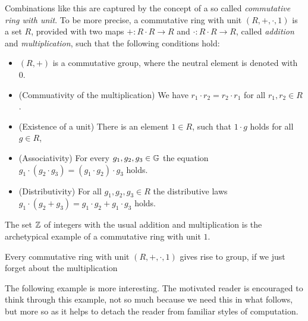 Combinations like this are captured by the concept of a so called \textit{commutative ring with unit}. To be more precise, a commutative ring with unit $ (R, +, \cdot, 1) $ is a set $R$, provided with two maps $ +: R \cdot R \to R $ and $ \cdot: R \cdot R \to R $, called \textit{addition} and \textit{multiplication}, such that the following conditions hold:
\begin{itemize}
\item $ \left (R, + \right) $ is a commutative group, where the neutral element is denoted  with $ 0 $.
\item (Commuativity of the multiplication) We have $r_1\cdot r_2 = r_2\cdot r_1$ for all $r_1, r_2\in R$.
\item (Existence of a unit) There is an element $1\in R$, such that $1\cdot g$ holds for all $g\in R$,
\item (Associativity) For every $g_1,g_2,g_3\in\mathbb{G}$ the equation
$g_1\cdot(g_2\cdot g_3) = (g_1\cdot g_2)\cdot g_3$ holds.
\item (Distributivity) For all $ g_1, g_2, g_3 \in R $ the distributive laws
$ g_1 \cdot \left (g_2 + g_3 \right) = g_1 \cdot g_2 + g_1 \cdot g_3$ holds.
\end{itemize}
\begin{example} The set $\mathbb{Z}$ of integers with the usual addition and multiplication is the archetypical example of a commutative ring with unit $1$.
\end{example}
\begin{example} Every commutative ring with unit $(R,+,\cdot,1)$ gives rise to group, if we just forget about the multiplication
\end{example}
The following example is more interesting. The motivated reader is encouraged to think through this example, not so much because we need this in what follows, but more so as it helps to detach the reader from familiar styles of computation.
